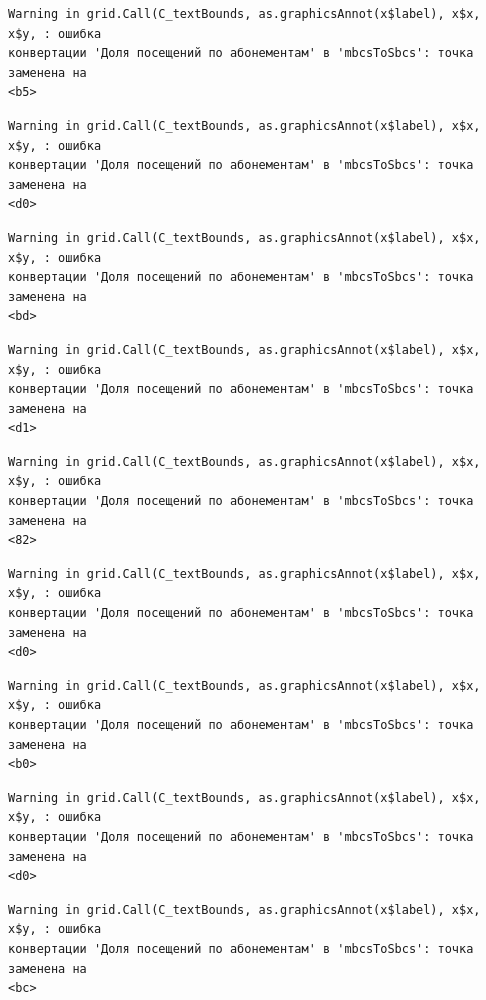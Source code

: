 \documentclass[
  letterpaper,
  DIV=11,
  numbers=noendperiod]{scrreprt}
\begin{document}
\begin{verbatim}
Warning in grid.Call(C_textBounds, as.graphicsAnnot(x$label), x$x, x$y, : ошибка
конвертации 'Доля посещений по абонементам' в 'mbcsToSbcs': точка заменена на
<b5>
\end{verbatim}

\begin{verbatim}
Warning in grid.Call(C_textBounds, as.graphicsAnnot(x$label), x$x, x$y, : ошибка
конвертации 'Доля посещений по абонементам' в 'mbcsToSbcs': точка заменена на
<d0>
\end{verbatim}

\begin{verbatim}
Warning in grid.Call(C_textBounds, as.graphicsAnnot(x$label), x$x, x$y, : ошибка
конвертации 'Доля посещений по абонементам' в 'mbcsToSbcs': точка заменена на
<bd>
\end{verbatim}

\begin{verbatim}
Warning in grid.Call(C_textBounds, as.graphicsAnnot(x$label), x$x, x$y, : ошибка
конвертации 'Доля посещений по абонементам' в 'mbcsToSbcs': точка заменена на
<d1>
\end{verbatim}

\begin{verbatim}
Warning in grid.Call(C_textBounds, as.graphicsAnnot(x$label), x$x, x$y, : ошибка
конвертации 'Доля посещений по абонементам' в 'mbcsToSbcs': точка заменена на
<82>
\end{verbatim}

\begin{verbatim}
Warning in grid.Call(C_textBounds, as.graphicsAnnot(x$label), x$x, x$y, : ошибка
конвертации 'Доля посещений по абонементам' в 'mbcsToSbcs': точка заменена на
<d0>
\end{verbatim}

\begin{verbatim}
Warning in grid.Call(C_textBounds, as.graphicsAnnot(x$label), x$x, x$y, : ошибка
конвертации 'Доля посещений по абонементам' в 'mbcsToSbcs': точка заменена на
<b0>
\end{verbatim}

\begin{verbatim}
Warning in grid.Call(C_textBounds, as.graphicsAnnot(x$label), x$x, x$y, : ошибка
конвертации 'Доля посещений по абонементам' в 'mbcsToSbcs': точка заменена на
<d0>
\end{verbatim}

\begin{verbatim}
Warning in grid.Call(C_textBounds, as.graphicsAnnot(x$label), x$x, x$y, : ошибка
конвертации 'Доля посещений по абонементам' в 'mbcsToSbcs': точка заменена на
<bc>
\end{verbatim}
\end{document}
